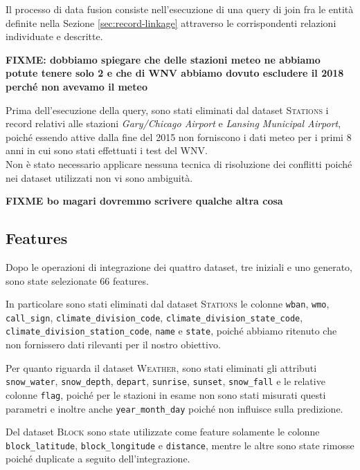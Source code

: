 Il processo di data fusion consiste nell'esecuzione di una query di join 
fra le entità definite nella Sezione \ref{sec:record-linkage} attraverso le 
corrispondenti relazioni individuate e descritte.

\textbf{FIXME: dobbiamo spiegare che delle stazioni meteo ne abbiamo potute 
	tenere solo 2 e che di WNV abbiamo dovuto escludere il 2018 perché non 
	avevamo il meteo}

Prima dell'esecuzione della query, sono stati eliminati dal dataset 
\textsc{Stations} i record relativi alle stazioni \textit{Gary/Chicago Airport} 
e \textit{Lansing Municipal Airport}, poiché essendo attive dalla fine del 2015 
non forniscono i dati meteo per i primi 8 anni in cui sono stati effettuati i 
test del WNV.\\

Non è stato necessario applicare nessuna tecnica di risoluzione dei conflitti 
poiché nei dataset utilizzati non vi sono ambiguità.

\textbf{FIXME bo magari dovremmo scrivere qualche altra cosa}

\subsection{Features}
Dopo le operazioni di integrazione dei quattro dataset, tre iniziali e uno 
generato, sono state selezionate 66 features.

In particolare sono stati eliminati dal dataset \textsc{Stations} le colonne 
\texttt{wban}, \texttt{wmo}, \texttt{call\_sign}, 
\texttt{climate\_division\_code}, \texttt{climate\_division\_state\_code}, \\
\texttt{climate\_division\_station\_code}, \texttt{name} e \texttt{state}, 
poiché abbiamo ritenuto che non fornissero dati rilevanti per il nostro 
obiettivo.

Per quanto riguarda il dataset \textsc{Weather}, sono stati eliminati gli 
attributi \texttt{snow\_water}, 
\texttt{snow\_depth}, \texttt{depart}, \texttt{sunrise}, \texttt{sunset}, 
\texttt{snow\_fall} e le relative colonne \texttt{flag}, poiché per le stazioni 
in esame non sono stati misurati questi parametri e inoltre anche 
\texttt{year\_month\_day} poiché non influisce sulla predizione.

Del dataset \textsc{Block} sono state utilizzate come feature solamente le 
colonne \texttt{block\_latitude}, \texttt{block\_longitude} e 
\texttt{distance}, mentre le altre sono state rimosse poiché duplicate a 
seguito dell'integrazione.


